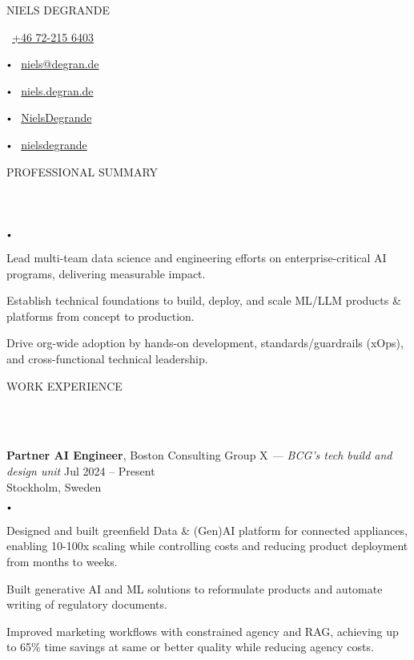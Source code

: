 \documentclass{article}
\newcommand{\contact}[2]{
    \begin{center}
    {\LARGE \uppercase {#1}} \\
    \vspace{8pt}
    #2
    \end{center}
}
\newcommand{\header}[1]{
    {
        \hspace*{-4pt}
        \vspace*{8pt}
        \uppercase{#1}
    }
    \vspace*{-4pt} 
    \lineunder
    \vspace*{8pt}
}
\newcommand{\lineunder}{
    \vspace*{-8pt} \\ 
    \hspace*{-4pt} 
    \hrulefill \\
}
\newcommand{\experience}[5]{
    \vspace*{2pt}
    \textbf{#1}, #2 \hfill #3 \\ 
    #4 \\
    #5
    \vspace*{2pt}
}
\newcommand{\bigdot}{
    $\vcenter{\hbox{\tiny$\bullet$}}$\hspace*{2pt}
}
\newcommand{\spacedbullet}{
    $\vcenter{\hbox{\tiny$\bullet$}}$\hspace*{-2pt}
}
\newenvironment{bulletlist}{
    \begin{list}
        {\spacedbullet}{\setlength\leftmargin{10pt} 
        \topsep 0pt \itemsep -2pt}}{\vspace*{4pt}
    \end{list}
}
\begin{document}
\small

\vspace*{-32pt}

\contact{Niels Degrande}
{
    \faPhone\ \href{tel:+46722156403}{+46 72-215 6403}
    \bigdot \faEnvelope\ \href{mailto:niels@degran.de}{niels@degran.de}
    \bigdot \faGlobe\ \href{https://niels.degran.de}{niels.degran.de}
    \bigdot \faGithub\ \href{https://github.com/NielsDegrande}{NielsDegrande}
    \bigdot \faLinkedin\ \href{https://linkedin.com/in/nielsdegrande}{nielsdegrande}
}

\vspace{16pt}

\header{Professional Summary}
\begin{bulletlist}
    \item Lead multi-team data science and engineering efforts on enterprise-critical AI programs, delivering measurable impact.
    \item Establish technical foundations to build, deploy, and scale ML/LLM products \& platforms from concept to production.
    \item Drive org-wide adoption by hands-on development, standards/guardrails (xOps), and cross-functional technical leadership.
\end{bulletlist}

\vspace*{4pt}

\header{Work Experience}
\experience{Partner AI Engineer}{Boston Consulting Group X \textit{— BCG's tech build and design unit}}{Jul 2024 -- Present}{Stockholm, Sweden}
{
    \begin{bulletlist}
        \item Designed and built greenfield Data \& (Gen)AI platform for connected appliances, enabling 10-100x scaling while controlling costs and reducing product deployment from months to weeks.
        \item Built generative AI and ML solutions to reformulate products and automate writing of regulatory documents.
        \item Improved marketing workflows with constrained agency and RAG, achieving up to 65\% time savings at same or better quality while reducing agency costs.
    \end{bulletlist}
}
\end{document}
